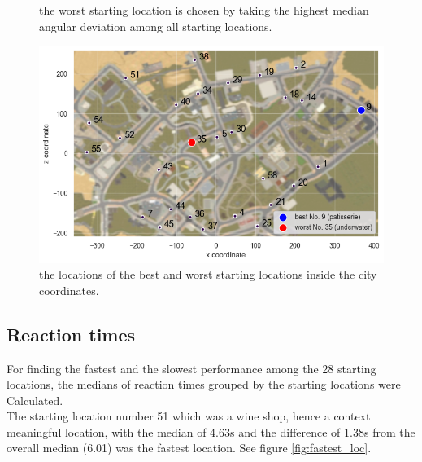 \begin{figure}[!h]
	\caption[Worst starting location based on angular deviation]{the worst starting location is chosen by taking the highest median angular deviation among all starting locations.}
\end{figure}
\label{fig:worst_location}

\begin{figure}[h]
	\centering
	\includegraphics[width=140mm]{figures/best_worst_starting_locations_map.png}
	\caption[Locations of best and worst starting locations in city]{the locations of the best and worst starting locations inside the city coordinates.}
	\label{fig:best_worst_locs}
\end{figure}


\subsection{Reaction times}

For finding the fastest and the slowest performance among the 28 starting locations, the medians of reaction times grouped by the starting locations were Calculated.\\
The starting location number 51 which was a wine shop, hence a context meaningful location, with the median of 4.63s and the difference of 1.38s from the overall median (6.01) was the fastest location. See figure \ref{fig:fastest_loc}.\\

